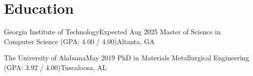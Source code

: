 \section{Education}
    \resumeSubHeadingListStart

    \resumeSubheading
    {Georgia Institute of Technology}{Expected Aug 2025}
    {Master of Science in Computer Science (GPA: 4.00 / 4.00)}{Altanta, GA }
    \resumeItemListStart
    \resumeItemListEnd

    \resumeSubheading
    {The University of Alabama}{May 2019}
    {PhD in Materials Metallurgical Engineering (GPA: 3.92 / 4.00)}{Tuscaloosa, AL }
    \resumeItemListStart
    \resumeItemListEnd

    \resumeSubHeadingListEnd